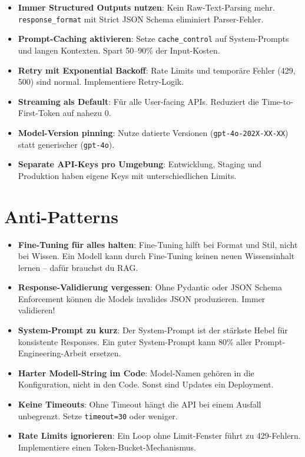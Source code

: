 \begin{itemize}[leftmargin=*]
    \item \textbf{Immer Structured Outputs nutzen}: Kein Raw-Text-Parsing mehr. \texttt{response\_format} mit Strict JSON Schema eliminiert Parser-Fehler.
    \item \textbf{Prompt-Caching aktivieren}: Setze \texttt{cache\_control} auf System-Prompts und langen Kontexten. Spart 50--90\% der Input-Kosten.
    \item \textbf{Retry mit Exponential Backoff}: Rate Limits und temporäre Fehler (429, 500) sind normal. Implementiere Retry-Logik.
    \item \textbf{Streaming als Default}: Für alle User-facing APIs. Reduziert die Time-to-First-Token auf nahezu 0.
    \item \textbf{Model-Version pinning}: Nutze datierte Versionen (\texttt{gpt-4o-202X-XX-XX}) statt generischer (\texttt{gpt-4o}).
    \item \textbf{Separate API-Keys pro Umgebung}: Entwicklung, Staging und Produktion haben eigene Keys mit unterschiedlichen Limits.
\end{itemize}

\section{Anti-Patterns}

\begin{itemize}[leftmargin=*]
    \item \textbf{Fine-Tuning für alles halten}: Fine-Tuning hilft bei Format und Stil, nicht bei Wissen. Ein Modell kann durch Fine-Tuning keinen neuen Wissensinhalt lernen -- dafür brauchst du RAG.
    \item \textbf{Response-Validierung vergessen}: Ohne Pydantic oder JSON Schema Enforcement können die Models invalides JSON produzieren. Immer validieren!
    \item \textbf{System-Prompt zu kurz}: Der System-Prompt ist der stärkste Hebel für konsistente Responses. Ein guter System-Prompt kann 80\% aller Prompt-Engineering-Arbeit ersetzen.
    \item \textbf{Harter Modell-String im Code}: Model-Namen gehören in die Konfiguration, nicht in den Code. Sonst sind Updates ein Deployment.
    \item \textbf{Keine Timeouts}: Ohne Timeout hängt die API bei einem Ausfall unbegrenzt. Setze \texttt{timeout=30} oder weniger.
    \item \textbf{Rate Limits ignorieren}: Ein Loop ohne Limit-Fenster führt zu 429-Fehlern. Implementiere einen Token-Bucket-Mechanismus.
\end{itemize}

